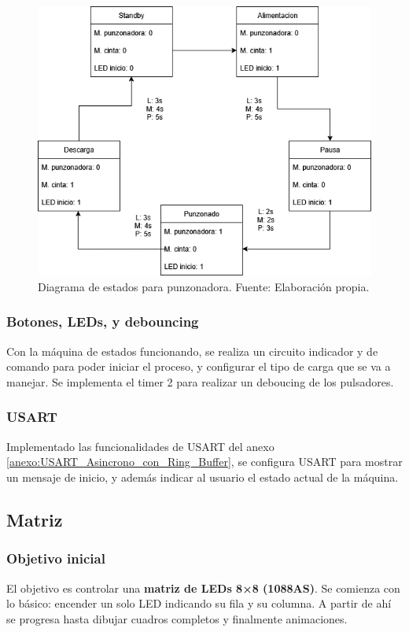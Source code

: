 \begin{figure}[H]
  \centering
  \includegraphics[width=\linewidth]{./Anexos/Metodologia/Punzonadora/Diagrama de estados.png}
  \caption{Diagrama de estados para punzonadora. Fuente: Elaboración propia.}
  \label{fig:punzoadora_estados}
\end{figure}

\subsubsection{Botones, LEDs,  y debouncing}
Con la máquina de estados funcionando, se realiza un circuito indicador y de comando para poder iniciar el proceso, y configurar el tipo de carga que se va a manejar. Se implementa el timer 2 para realizar un deboucing de los pulsadores. 

\subsubsection{USART}
Implementado las funcionalidades de USART del anexo \ref{anexo:USART_Asincrono_con_Ring_Buffer}, se configura USART para mostrar un mensaje de inicio, y además indicar al usuario el estado actual de la máquina.



\subsection{Matriz}

\subsubsection{Objetivo inicial}
El objetivo es controlar una \textbf{matriz de LEDs 8×8 (1088AS)}. Se comienza con lo básico: encender un solo LED indicando su fila y su columna. A partir de ahí se progresa hasta dibujar cuadros completos y finalmente animaciones.

